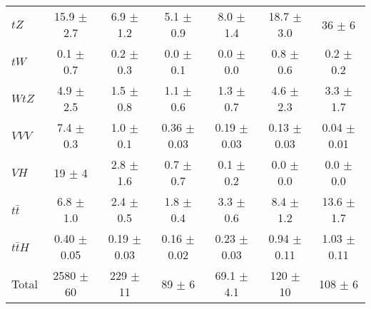 \begin{tabular}{|l|c|c|c|c|c|c|}
  $tZ$   & 15.9 $\pm$ 2.7 & 6.9 $\pm$ 1.2 & 5.1 $\pm$ 0.9 & 8.0 $\pm$ 1.4 & 18.7 $\pm$ 3.0 & 36 $\pm$ 6 \\ 
  $tW$   & 0.1 $\pm$ 0.7 & 0.2 $\pm$ 0.3 & 0.0 $\pm$ 0.1 & 0.0 $\pm$ 0.0 & 0.8 $\pm$ 0.6 & 0.2 $\pm$ 0.2 \\ 
  $WtZ$   & 4.9 $\pm$ 2.5 & 1.5 $\pm$ 0.8 & 1.1 $\pm$ 0.6 & 1.3 $\pm$ 0.7 & 4.6 $\pm$ 2.3 & 3.3 $\pm$ 1.7 \\ 
  $VVV$   & 7.4 $\pm$ 0.3 & 1.0 $\pm$ 0.1 & 0.36 $\pm$ 0.03 & 0.19 $\pm$ 0.03 & 0.13 $\pm$ 0.03 & 0.04 $\pm$ 0.01 \\ 
  $VH$   & 19 $\pm$ 4 & 2.8 $\pm$ 1.6 & 0.7 $\pm$ 0.7 & 0.1 $\pm$ 0.2 & 0.0 $\pm$ 0.0 & 0.0 $\pm$ 0.0 \\ 
  $t\bar{t}$   & 6.8 $\pm$ 1.0 & 2.4 $\pm$ 0.5 & 1.8 $\pm$ 0.4 & 3.3 $\pm$ 0.6 & 8.4 $\pm$ 1.2 & 13.6 $\pm$ 1.7 \\ 
  $t\bar{t}H$   & 0.40 $\pm$ 0.05 & 0.19 $\pm$ 0.03 & 0.16 $\pm$ 0.02 & 0.23 $\pm$ 0.03 & 0.94 $\pm$ 0.11 & 1.03 $\pm$ 0.11 \\ 
\hline 
  Total  & 2580 $\pm$ 60 & 229 $\pm$ 11 & 89 $\pm$ 6 & 69.1 $\pm$ 4.1 & 120 $\pm$ 10 & 108 $\pm$ 6 \\ 
\hline 
\end{tabular} 

